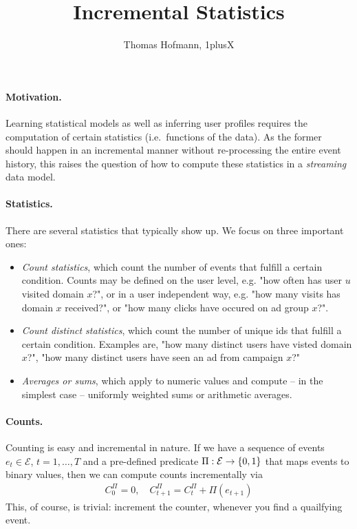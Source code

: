 \documentclass{article}
\title{Incremental Statistics}
\author{Thomas Hofmann, 1plusX}
\begin{document}
\maketitle 

\paragraph{Motivation.} Learning statistical models as well as inferring user profiles requires the computation of certain statistics (i.e.~functions of the data). As the former should happen in an incremental manner without re-processing the entire event history, this raises the question of how to compute these statistics in a \textit{streaming} data model. 

\paragraph{Statistics.}  There are several statistics that typically show up.  We focus on three important ones:  
\begin{itemize}
\item \textit{Count statistics}, which count the number of events that fulfill a certain condition. Counts may be defined on the user level, e.g. "how often has user $u$ visited domain $x$?", or in a user independent way, e.g. "how many visits has domain $x$ received?", or "how many clicks have occured on ad group $x$?". 
\item \textit{Count distinct statistics}, which count the number of unique ids that fulfill a certain condition. Examples are, "how many distinct users have visted domain $x$?", "how many distinct users have seen an ad from campaign $x$?"  
\item \textit{Averages or sums}, which apply to numeric values and compute -- in the simplest case -- uniformly weighted sums or arithmetic averages.  
\end{itemize}

\paragraph{Counts.} Counting is easy and incremental in nature. If we have a sequence of events $e_t \in \mathcal{E}$, $t=1,\dots,T$ and a pre-defined predicate $\Pi: {\cal E} \to \{0,1\}$ that maps events to binary values, then we can compute counts incrementally via 
\begin{align}
C_0^\Pi = 0, \quad C^\Pi_{t+1} = C^\Pi_{t} + \Pi(e_{t+1})
\end{align}
This, of course, is trivial: increment the counter, whenever you find a quailfying event. 
\end{document}
